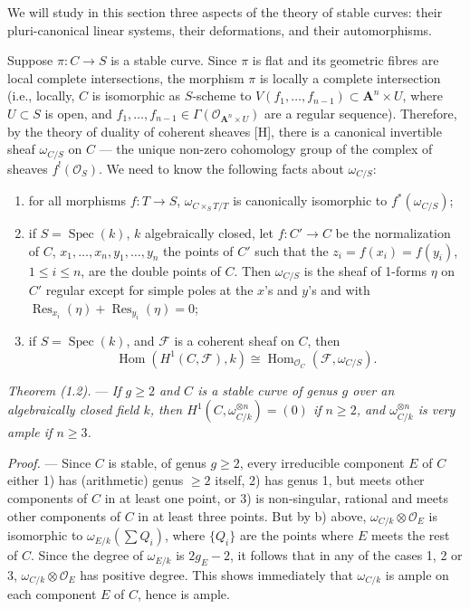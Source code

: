 \documentclass[10pt]{article}
\newcommand{\Spec}{\operatorname{Spec}}
\newcommand{\Hom}{\operatorname{Hom}}
\newcommand{\Res}{\operatorname{Res}}
\newcommand{\cO}{\mathcal O}
\newcommand{\cF}{\mathcal F}
\newcommand{\A}{\mathbf A}
\begin{document}
We will study in this section three aspects of the theory of stable curves: their pluri-canonical linear systems, their deformations, and their automorphisms.

Suppose $\pi:C\to S$ is a stable curve. Since $\pi$ is flat and its geometric fibres are local complete intersections, the morphism $\pi$ is locally a complete intersection (i.e., locally, $C$ is isomorphic as $S$-scheme to $V(f_1,\ldots,f_{n-1})\subset \A^n\times U$, where $U\subset S$ is open, and $f_1,\ldots,f_{n-1}\in\Gamma(\cO_{\A^n\times U})$ are a regular sequence). Therefore, by the theory of duality of coherent sheaves [H], there is a canonical invertible sheaf $\omega_{C/S}$ on $C$ --- the unique non-zero cohomology group of the complex of sheaves $f^!(\cO_S)$. We need to know the following facts about $\omega_{C/S}$:
\begin{enumerate}[label=\alph*)]
\item for all morphisms $f:T\to S$, $\omega_{C\times_S T/T}$ is canonically isomorphic to $f^*(\omega_{C/S})$;
\item if $S=\Spec(k)$, $k$ algebraically closed, let $f:C'\to C$ be the normalization of $C$, $x_1,\ldots,x_n,y_1,\ldots,y_n$ the points of $C'$ such that the $z_i=f(x_i)=f(y_i)$, $1\leq i\leq n$, are the double points of $C$. Then $\omega_{C/S}$ is the sheaf of 1-forms $\eta$ on $C'$ regular except for simple poles at the $x$'s and $y$'s and with $\Res_{x_i}(\eta)+\Res_{y_i}(\eta)=0$;
\item if $S=\Spec(k)$, and $\cF$ is a coherent sheaf on $C$, then
\[
\Hom(H^1(C,\cF),k)\cong \Hom_{\cO_C}(\cF,\omega_{C/S}).
\]
\end{enumerate}

\medskip
\noindent\textit{Theorem (1.2).} --- \textit{If $g\geq 2$ and $C$ is a stable curve of genus $g$ over an algebraically closed field $k$, then $H^1(C,\omega_{C/k}^{\otimes n})=(0)$ if $n\geq 2$, and $\omega_{C/k}^{\otimes n}$ is very ample if $n\geq 3$.}

\medskip
\noindent\textit{Proof.} --- Since $C$ is stable, of genus $g\geq 2$, every irreducible component $E$ of $C$ either 1) has (arithmetic) genus $\geq 2$ itself, 2) has genus 1, but meets other components of $C$ in at least one point, or 3) is non-singular, rational and meets other components of $C$ in at least three points. But by b) above, $\omega_{C/k}\otimes\cO_E$ is isomorphic to $\omega_{E/k}(\sum Q_i)$, where $\{Q_i\}$ are the points where $E$ meets the rest of $C$. Since the degree of $\omega_{E/k}$ is $2g_E-2$, it follows that in any of the cases 1, 2 or 3, $\omega_{C/k}\otimes\cO_E$ has positive degree. This shows immediately that $\omega_{C/k}$ is ample on each component $E$ of $C$, hence is ample.
\end{document}
